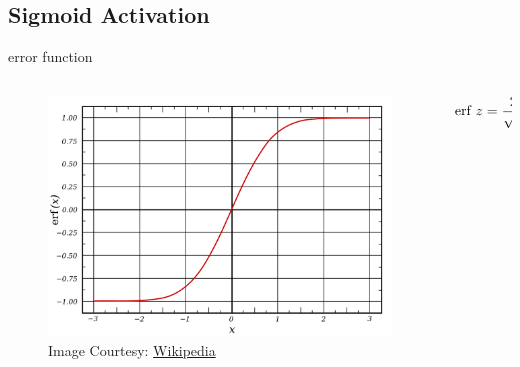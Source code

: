 \documentclass[aspectratio=169,xcolor={dvipsnames,svgnames}]{beamer}
\begin{document}
\subsection{Sigmoid Activation}
\label{sec:sigmoid-activation}
\begin{frame}[label={sec:error-function}]{error function}
\begin{columns}
\begin{column}{0.65\columnwidth}
\begin{figure}[htbp]
\centering
\includegraphics[width=.9\linewidth]{org-download-images/details/2024-09-16_22-48-51_screenshot.png}
\caption{Image Courtesy: \href{https://commons.wikimedia.org/wiki/File:Error\_Function.svg}{Wikipedia}}
\end{figure}
\end{column}

\begin{column}{0.35\columnwidth}
\begin{align}
  \notag
  \mathrm{erf}\;z &= \frac2{\sqrt\pi} \int_0^z e^{-t^2}
                   \mathrm{d}t 
\end{align}
\end{column}
\end{columns}
\end{frame}
\end{document}
